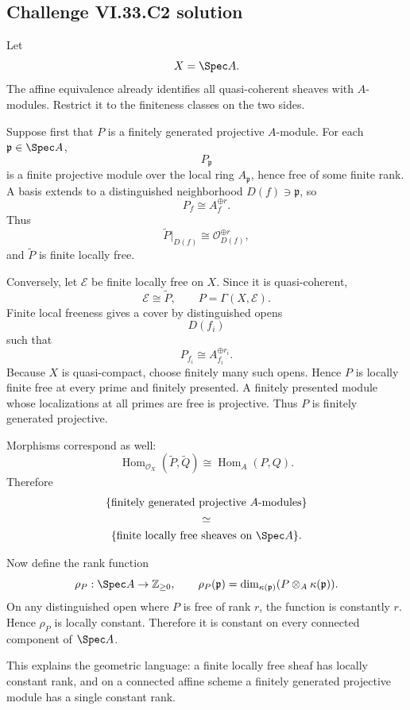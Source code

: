 \subsection*{Challenge VI.33.C2 solution}
\begin{solution}
Let
\[
X=\Spec A.
\]
The affine equivalence already identifies all quasi-coherent sheaves with \(A\)-modules.  Restrict it to the
finiteness classes on the two sides.

Suppose first that \(P\) is a finitely generated projective \(A\)-module.  For each
\(\mathfrak p\in\Spec A\),
\[
P_{\mathfrak p}
\]
is a finite projective module over the local ring \(A_{\mathfrak p}\), hence free of some finite rank.  A basis
extends to a distinguished neighborhood \(D(f)\ni\mathfrak p\), so
\[
P_f\cong A_f^{\oplus r}.
\]
Thus
\[
\widetilde P|_{D(f)}
\cong
\mathcal O_{D(f)}^{\oplus r},
\]
and \(\widetilde P\) is finite locally free.

Conversely, let \(\mathcal E\) be finite locally free on \(X\).  Since it is quasi-coherent,
\[
\mathcal E\cong\widetilde P,
\qquad
P=\Gamma(X,\mathcal E).
\]
Finite local freeness gives a cover by distinguished opens
\[
D(f_i)
\]
such that
\[
P_{f_i}\cong A_{f_i}^{\oplus r_i}.
\]
Because \(X\) is quasi-compact, choose finitely many such opens.  Hence \(P\) is locally finite free at every prime
and finitely presented.  A finitely presented module whose localizations at all primes are free is projective.
Thus \(P\) is finitely generated projective.

Morphisms correspond as well:
\[
\operatorname{Hom}_{\mathcal O_X}(\widetilde P,\widetilde Q)
\cong
\operatorname{Hom}_A(P,Q).
\]
Therefore
\[
\begin{gathered}
\{\text{finitely generated projective }A\text{-modules}\}\\
\simeq\\
\{\text{finite locally free sheaves on }\Spec A\}.
\end{gathered}
\]

Now define the rank function
\[
\rho_P:\Spec A\to\mathbb Z_{\ge0},
\qquad
\rho_P(\mathfrak p)
=
\dim_{\kappa(\mathfrak p)}
(P\otimes_A\kappa(\mathfrak p)).
\]
On any distinguished open where \(P\) is free of rank \(r\), the function is constantly \(r\). Hence \(\rho_P\)
is locally constant.  Therefore it is constant on every connected component of \(\Spec A\).

This explains the geometric language: a finite locally free sheaf has locally constant rank, and on a connected
affine scheme a finitely generated projective module has a single constant rank.
\end{solution}

